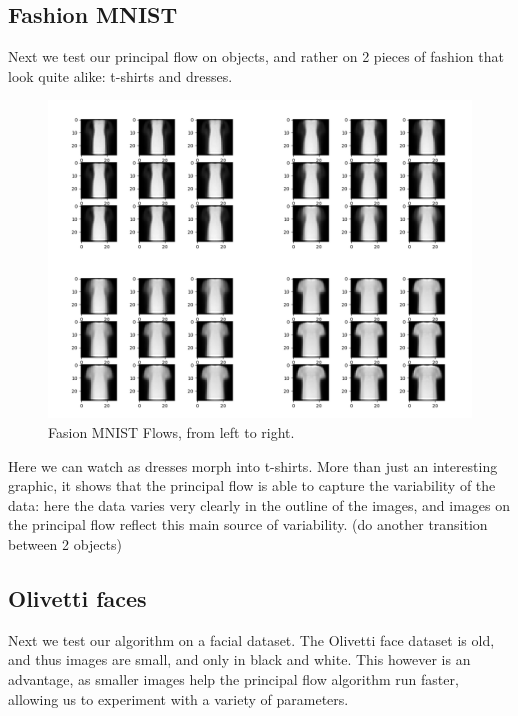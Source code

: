 \documentclass[12pt]{report}
\begin{document}
\subsection{Fashion MNIST}

Next we test our principal flow on objects, and rather on 2 pieces of fashion that
look quite alike: t-shirts and dresses.

\begin{figure}[h]
    \begin{center}
        \includegraphics[scale=0.2]{main_fashion.png}
        \caption{Fasion MNIST Flows, from left to right.}
        \label{fig:fashionmnistflows}
    \end{center}
\end{figure}

Here we can watch as dresses morph into t-shirts. More than just an interesting graphic,
it shows that the principal flow is able to capture the variability of the data:
here the data varies very clearly in the outline of the images, and images on the
principal flow reflect this main source of variability.
(do another transition between 2 objects)

\subsection{Olivetti faces}

Next we test our algorithm on a facial dataset. The Olivetti face dataset is old,
and thus images are small, and only in black and white. This however is 
an advantage, as smaller images help the principal flow algorithm run faster,
allowing us to experiment with a variety of parameters.
\end{document}
